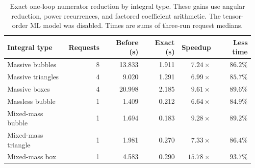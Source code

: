 \begin{table}[!htbp]\centering\small
\caption{Exact one-loop numerator reduction by integral type. These gains use angular reduction, power recurrences, and factored coefficient arithmetic. The tensor-order ML model was disabled. Times are sums of three-run request medians.}
\label{tab:tensor-type-summary}
\begin{tabularx}{\linewidth}{@{}Yrrrrr@{}}\toprule
Integral type & Requests & Before (s) & Exact (s) & Speedup & Less time\\\midrule
Massive bubbles & 8 & 13.833 & 1.911 & $7.24\times$ & $86.2\%$ \\
Massive triangles & 4 & 9.020 & 1.291 & $6.99\times$ & $85.7\%$ \\
Massive boxes & 4 & 20.998 & 2.185 & $9.61\times$ & $89.6\%$ \\
Massless bubble & 1 & 1.409 & 0.212 & $6.64\times$ & $84.9\%$ \\
Mixed-mass bubble & 1 & 1.694 & 0.183 & $9.28\times$ & $89.2\%$ \\
Mixed-mass triangle & 1 & 1.981 & 0.270 & $7.33\times$ & $86.4\%$ \\
Mixed-mass box & 1 & 4.583 & 0.290 & $15.78\times$ & $93.7\%$ \\
\bottomrule\end{tabularx}
\end{table}
